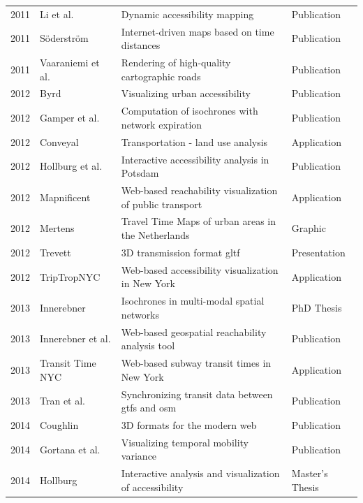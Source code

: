 \begin{table}[htp]
\begin{tabular}{r|l|l|l}
      2011 & Li et al. \cite{li2011dynamic} & Dynamic accessibility mapping & Publication \\
      2011 & Söderström \cite{soderstrom2011personal} & Internet-driven maps based on time distances & Publication \\
      2011 & Vaaraniemi et al. \cite{Vaaraniemi2011} & Rendering of high-quality cartographic roads & Publication \\
      2012 & Byrd \cite{Byrd2012} & Visualizing urban accessibility & Publication \\
      2012 & Gamper et al. \cite{gamper2012scalable} & Computation of isochrones with network expiration & Publication \\
      2012 & Conveyal \cite{Conveyal} & Transportation - land use analysis & Application \\
      2012 & Hollburg et al. \cite{hollburghier} & Interactive accessibility analysis in Potsdam & Publication \\
      2012 & Mapnificent \cite{Mapnificent} & Web-based reachability visualization of public transport & Application \\
      2012 & Mertens \cite{meertens2012} & Travel Time Maps of urban areas in the Netherlands & Graphic \\
      2012 & Trevett \cite{Trevett2012} & 3D transmission format \acrshort{gltf} & Presentation \\
      2012 & TripTropNYC \cite{TriptropNYC} & Web-based accessibility visualization in New York & Application \\
      2013 & Innerebner \cite{Innerebner2013} & Isochrones in multi-modal spatial networks & PhD Thesis \\
      2013 & Innerebner et al. \cite{innerebner2013isoga} & Web-based geospatial reachability analysis tool & Publication \\
      2013 & Transit Time NYC \cite{TransitTimeNYC} & Web-based subway transit times in New York & Application \\
      2013 & Tran et al. \cite{tran2013go_sync} & Synchronizing transit data between \acrshort{gtfs} and \acrshort{osm} & Publication \\
      2014 & Coughlin \cite{Coughlin2014} & 3D formats for the modern web & Publication \\
      2014 & Gortana et al. \cite{gortanaisoscope} & Visualizing temporal mobility variance & Publication \\
      2014 & Hollburg \cite{Hollburg2014} & Interactive analysis and visualization of accessibility & Master's Thesis \\

\end{tabular}
\end{table}
